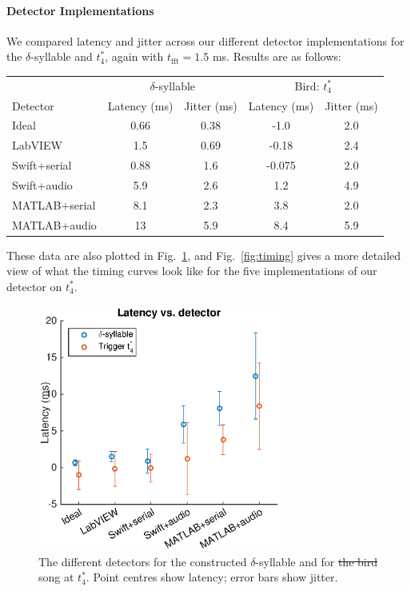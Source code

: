\documentclass[10pt,letterpaper]{article}
\newcommand\fig[1]{Fig.~\ref{#1}}
\renewcommand{\subsubsection}[1]{\paragraph{#1}}
\providecommand{\DIFaddtex}[1]{{\protect\color{blue}\uwave{#1}}} %
\providecommand{\DIFdeltex}[1]{{\protect\color{red}\sout{#1}}}                      %
\providecommand{\DIFaddbegin}{} %
\providecommand{\DIFaddend}{} %
\providecommand{\DIFdelbegin}{} %
\providecommand{\DIFdelend}{} %
\providecommand{\DIFaddFL}[1]{\DIFadd{#1}} %
\providecommand{\DIFdelFL}[1]{\DIFdel{#1}} %
\providecommand{\DIFaddbeginFL}{} %
\providecommand{\DIFaddendFL}{} %
\providecommand{\DIFdelbeginFL}{} %
\providecommand{\DIFdelendFL}{} %
\providecommand{\DIFadd}[1]{\texorpdfstring{\DIFaddtex{#1}}{#1}} %
\providecommand{\DIFdel}[1]{\texorpdfstring{\DIFdeltex{#1}}{}} %
\begin{document}
\subsubsection{Detector Implementations}


We compared latency and jitter across our different detector
implementations for the $\delta$-syllable and \DIFaddbegin \DIFadd{lny64's }\DIFaddend $t^*_4$, again with
$t_\mathrm{fft}=1.5$ ms.  Results are as follows:
\vspace{8pt}
\DIFdelbegin %
\DIFdelend \DIFaddbegin \begin{tabular}{l|c|c|c|c}
  \DIFaddend & \multicolumn{2}{c}{$\delta$-syllable} & \multicolumn{2}{c}{Bird: $t^*_4$} \\
  Detector & Latency (ms) & Jitter (ms) & Latency (ms) & Jitter (ms) \\
  \hline
  Ideal & 0.66 & 0.38 & -1.0 & 2.0 \\
  LabVIEW & 1.5 & 0.69 & -0.18 & 2.4 \\
  Swift+serial & 0.88 & 1.6 & -0.075 & 2.0 \\
  Swift+audio & 5.9 & 2.6 & 1.2 & 4.9 \\
  MATLAB+serial & 8.1 & 2.3 & 3.8 & 2.0 \\
  MATLAB+audio & 13 & 5.9 & 8.4 & 5.9
\end{tabular}
\vspace{8pt}\par\noindent
These data are also plotted in \fig{fig:TimingVsDetector}, and
\fig{fig:timing} gives a more detailed view of what the timing curves
look like for the five implementations of our detector on $t^*_4$.

\begin{figure}
  \begin{center}
    \includegraphics[width=8cm]{Fig6}
  \end{center}
  \caption{The different detectors for the constructed
    $\delta$-syllable and for \DIFdelbeginFL \DIFdelFL{the bird }\DIFdelendFL \DIFaddbeginFL \DIFaddFL{lny64's }\DIFaddendFL song at $t^*_4$.  Point centres
    show latency; error bars show jitter.}
  \label{fig:TimingVsDetector}
\end{figure}
\end{document}
